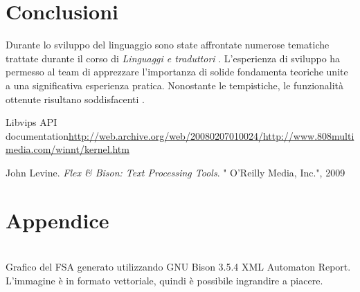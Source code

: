 \documentclass[10pt]{article}
\begin{document}
\section{Conclusioni}
Durante lo sviluppo del linguaggio sono state affrontate numerose tematiche trattate durante il corso di \textit{Linguaggi e traduttori} . L'esperienza di sviluppo ha permesso al team di apprezzare l'importanza di solide fondamenta teoriche unite a una significativa esperienza pratica. Nonostante le tempistiche, le funzionalità ottenute risultano soddisfacenti .
\clearpage

\clearpage


\begin{thebibliography}{toc}
	
	Libvips API documentation{ {\url{http://web.archive.org/web/20080207010024/http://www.808multimedia.com/winnt/kernel.htm}}}

	 John Levine.\textit{ Flex \& Bison: Text Processing Tools}. " O’Reilly Media, Inc.", 2009
\end{thebibliography}

\clearpage
\section*{Appendice}\label{section:appendix}

\begin{center}
	\centering
	\\
	Grafico del FSA generato utilizzando GNU Bison 3.5.4 XML Automaton Report. L'immagine è in formato vettoriale, quindi è possibile ingrandire a piacere.
\end{center}
\clearpage
\end{document}
